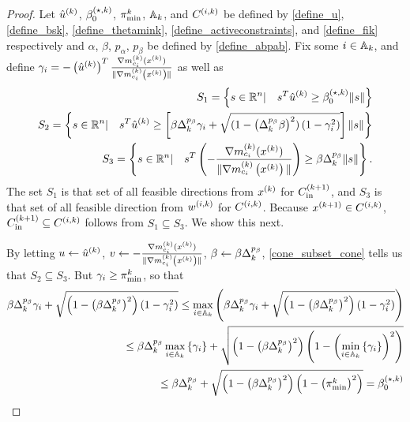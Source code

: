 
\begin{proof}

Let 
${{\hat u}^{(k)}}$, ${\beta_0^{(\star, k)}}$, ${\pi^k_{\textrm{min}}}$, ${\mathbb A_{k}}$, and ${C^{(i, k)}}$
be defined by
\cref{define_u}, \cref{define_bsk}, \cref{define_thetamink}, \cref{define_activeconstraints}, and \cref{define_fik} 
respectively and $\alpha$, $\beta$, $p_{\alpha}$, $p_{\beta}$ be defined by \cref{define_abpab}.
Fix some $i \in {\mathbb A_{k}}$, and define $\gamma_i = -\left({{\hat u}^{(k)}}\right)^T{\frac{\nabla m^{(k)}_{c_i}(x^{(k)})}{\|\nabla m^{(k)}_{c_i}\left(x^{(k)}\right)\|}}$ as well as
\begin{align*}
S_1 = \left\{s\in\mathbb R^n | \quad s^T{{\hat u}^{(k)}}\ge{\beta_0^{(\star, k)}}\|s\| \right\} \\
S_2 = \left\{s\in\mathbb R^n | \quad s^T{{\hat u}^{(k)}}\ge\left[\beta\Delta_k^{p_{\beta}}\gamma_i + \sqrt{(1 - \left(\Delta_k^{p_{\beta}}\beta\right)^2)\left(1 - \gamma_i^2\right)}\right]\|s\| \right\} \\
S_3 = \left\{s\in\mathbb R^n | \quad s^T\left(-{\frac{\nabla m^{(k)}_{c_i}(x^{(k)})}{\|\nabla m^{(k)}_{c_i}\left(x^{(k)}\right)\|}}\right)\ge\beta\Delta_k^{p_{\beta}}\|s\| \right\}.
\end{align*}
The set $S_1$ is that set of all feasible directions from $x^{(k)}$ for ${C^{(k+1)}_{\textrm{in}}}$, and $S_3$ is that set of all feasible direction from ${w^{(i, k)}}$ for ${C^{(i, k)}}$.
Because ${{x}^{(k+1)}} \in {C^{(i, k)}}$, ${C^{(k+1)}_{\textrm{in}}} \subseteq {C^{(i, k)}}$ follows from $S_1 \subseteq S_3$.
We show this next.


By letting $u \gets {{\hat u}^{(k)}}$, $v \gets -{\frac{\nabla m^{(k)}_{c_i}(x^{(k)})}{\|\nabla m^{(k)}_{c_i}\left(x^{(k)}\right)\|}}$, $\beta \gets \beta \Delta_k^{p_{\beta}}$, \cref{cone_subset_cone} tells us that
$S_2 \subseteq S_3$.
But $\gamma_i \ge {\pi^k_{\textrm{min}}}$, so that
\begin{align*}
\beta\Delta_k^{p_{\beta}}\gamma_i + \sqrt{\left(1 - \left(\beta\Delta_k^{p_{\beta}}\right)^2\right)\left(1 - \gamma_i^2\right)}
\le \max_{i\in{\mathbb A_{k}}} \left(\beta\Delta_k^{p_{\beta}}\gamma_i + \sqrt{\left(1 - \left(\beta\Delta_k^{p_{\beta}}\right)^2\right)\left(1 - \gamma_i^2\right)}\right) \\
\le \beta\Delta_k^{p_{\beta}} \max_{i\in{\mathbb A_{k}}}\left\{\gamma_i\right\} + \sqrt{\left(1 - \left(\beta\Delta_k^{p_{\beta}}\right)^2\right)\left(1 - \left(\min_{i\in{\mathbb A_{k}}}\left\{\gamma_i\right\}\right)^2\right)} \\
\le \beta\Delta_k^{p_{\beta}} + \sqrt{\left(1 - \left(\beta\Delta_k^{p_{\beta}}\right)^2\right)\left(1 - \left({\pi^k_{\textrm{min}}}\right)^2\right)} = {\beta_0^{(\star, k)}}
\end{align*}


\end{proof}
